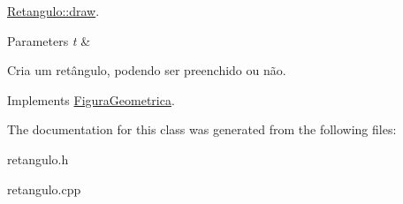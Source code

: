 \hyperlink{classRetangulo_ac088dd6d3f4f3d3f80363a868c2e74f1}{Retangulo\+::draw}. 


\begin{DoxyParams}{Parameters}
{\em t} & \\
\hline
\end{DoxyParams}
Cria um retângulo, podendo ser preenchido ou não. 

Implements \hyperlink{classFiguraGeometrica_a68c63fbb8df93c677d9e8d134bb57f94}{Figura\+Geometrica}.



The documentation for this class was generated from the following files\+:\begin{DoxyCompactItemize}
\item 
retangulo.\+h\item 
retangulo.\+cpp\end{DoxyCompactItemize}
